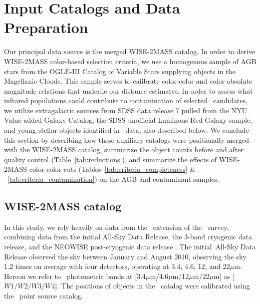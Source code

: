 \section{Input Catalogs and Data Preparation}
\label{sec:data}

Our principal data source is the merged WISE-2MASS catalog. In order to derive
WISE-2MASS color-based selection criteria, we use %
a homogenous sample of AGB stars from the OGLE-III Catalog of Variable Stars supplying objects in the Magellanic Clouds. This sample serves to calibrate color-color and color-absolute magnitude
relations that underlie our distance estimates. In order to assess what infrared populations
could contribute to contamination of selected \agb\ candidates, we utilize
extragalactic sources from SDSS data release 7 pulled from the NYU Value-added Galaxy Catalog,
the SDSS unofficial Luminous Red Galaxy sample,
and young stellar objects identified in \wise\ data, also described below. 
We conclude this section by describing how these auxiliary catalogs were positionally merged
with the WISE-2MASS catalog, summarize the object counts before and after quality control (Table~\ref{tab:reductions}), and summarize the effects of WISE-2MASS color-color cuts (Tables~\ref{tab:criteria_completeness} \& ~\ref{tab:criteria_contamination}) on the AGB and contaminant samples. 

\subsection{WISE-2MASS catalog}
In this study, we rely heavily on data from the \allwise\, extension of the \wise\, survey, combining data from the initial All-Sky Data Release, the 3-band cryogenic data release, and the NEOWISE post-cryogenic data release \citep{2013wise.rept....1C}. The initial \wise\,All-Sky Data Release observed the sky between January and August 2010, observing the sky 1.2 times on average with four detectors, operating at 3.4, 4.6, 12, and 22$\mu$m. Hereon we refer to \allwise\, photometric bands at [3.4$\mu$m/4.6$\mu$m/12$\mu$m/22$\mu$m] as [$W1/W2/W3/W4$]. The positions of objects in the \wise\, catalog were calibrated using the \twomass\, point source catalog. 

